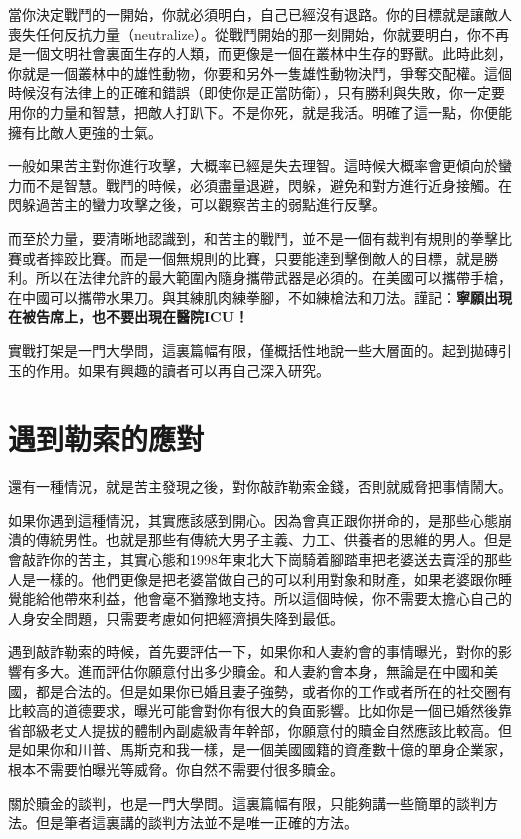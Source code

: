 當你決定戰鬥的一開始，你就必須明白，自己已經沒有退路。你的目標就是讓敵人喪失任何反抗力量（neutralize）。從戰鬥開始的那一刻開始，你就要明白，你不再是一個文明社會裏面生存的人類，而更像是一個在叢林中生存的野獸。此時此刻，你就是一個叢林中的雄性動物，你要和另外一隻雄性動物決鬥，爭奪交配權。這個時候沒有法律上的正確和錯誤（即使你是正當防衛），只有勝利與失敗，你一定要用你的力量和智慧，把敵人打趴下。不是你死，就是我活。明確了這一點，你便能擁有比敵人更強的士氣。

一般如果苦主對你進行攻擊，大概率已經是失去理智。這時候大概率會更傾向於蠻力而不是智慧。戰鬥的時候，必須盡量退避，閃躲，避免和對方進行近身接觸。在閃躲過苦主的蠻力攻擊之後，可以觀察苦主的弱點進行反擊。

而至於力量，要清晰地認識到，和苦主的戰鬥，並不是一個有裁判有規則的拳擊比賽或者摔跤比賽。而是一個無規則的比賽，只要能達到擊倒敵人的目標，就是勝利。所以在法律允許的最大範圍內隨身攜帶武器是必須的。在美國可以攜帶手槍，在中國可以攜帶水果刀。與其練肌肉練拳腳，不如練槍法和刀法。謹記：\textbf{寧願出現在被告席上，也不要出現在醫院ICU！}

實戰打架是一門大學問，這裏篇幅有限，僅概括性地說一些大層面的。起到拋磚引玉的作用。如果有興趣的讀者可以再自己深入研究。

\section{遇到勒索的應對}

還有一種情況，就是苦主發現之後，對你敲詐勒索金錢，否則就威脅把事情鬧大。

如果你遇到這種情況，其實應該感到開心。因為會真正跟你拼命的，是那些心態崩潰的傳統男性。也就是那些有傳統大男子主義、力工、供養者的思維的男人。但是會敲詐你的苦主，其實心態和1998年東北大下崗騎着腳踏車把老婆送去賣淫的那些人是一樣的。他們更像是把老婆當做自己的可以利用對象和財產，如果老婆跟你睡覺能給他帶來利益，他會毫不猶豫地支持。所以這個時候，你不需要太擔心自己的人身安全問題，只需要考慮如何把經濟損失降到最低。

遇到敲詐勒索的時候，首先要評估一下，如果你和人妻約會的事情曝光，對你的影響有多大。進而評估你願意付出多少贖金。和人妻約會本身，無論是在中國和美國，都是合法的。但是如果你已婚且妻子強勢，或者你的工作或者所在的社交圈有比較高的道德要求，曝光可能會對你有很大的負面影響。比如你是一個已婚然後靠省部級老丈人提拔的體制內副處級青年幹部，你願意付的贖金自然應該比較高。但是如果你和川普、馬斯克和我一樣，是一個美國國籍的資產數十億的單身企業家，根本不需要怕曝光等威脅。你自然不需要付很多贖金。

關於贖金的談判，也是一門大學問。這裏篇幅有限，只能夠講一些簡單的談判方法。但是筆者這裏講的談判方法並不是唯一正確的方法。

